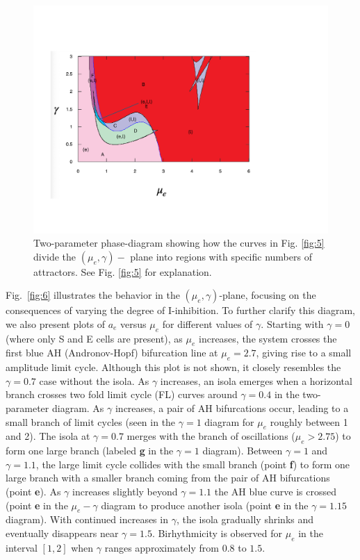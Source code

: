 \documentclass[10pt,letterpaper]{article}
\begin{document}
\begin{figure}
\includegraphics[width=.9\textwidth]{afig8.pdf}
\caption{Two-parameter phase-diagram showing how the curves in Fig. \ref{fig:5} divide the $(\mu_e,\gamma)-$ plane into regions with specific numbers of attractors. See Fig. \ref{fig:5} for explanation. }
\label{fig:7}
\end{figure}





Fig.~\ref{fig:6} illustrates the behavior in the $(\mu_e,\gamma)$-plane, focusing on the consequences of varying the degree of I-inhibition. To further clarify this diagram, we also present plots of $a_e$ versus $\mu_e$ for different values of $\gamma$. Starting with $\gamma = 0$ (where only S and E cells are present), as $\mu_e$ increases, the system crosses the first blue AH (Andronov-Hopf) bifurcation line at $\mu_e = 2.7$, giving rise to a small amplitude limit cycle. Although this plot is not shown, it closely resembles the $\gamma = 0.7$ case without the isola. As $\gamma$ increases, an isola emerges when a horizontal branch crosses two fold limit cycle (FL) curves around $\gamma = 0.4$ in the two-parameter diagram. As $\gamma$ increases, a pair of AH bifurcations occur, leading to a small branch of limit cycles (seen in the $\gamma=1$ diagram for $\mu_e$ roughly between 1 and 2). The isola at $\gamma=0.7$ merges with the branch of oscillations ($\mu_e>2.75$) to form one large branch (labeled {\bf g} in the $\gamma=1$ diagram).   Between $\gamma=1$ and $\gamma=1.1$, the large limit cycle collides with the small branch (point {\bf f}) to form one large branch with a smaller branch coming from the pair of AH bifurcations (point {\bf e}). As $\gamma$ increases slightly beyond $\gamma = 1.1$ the AH blue curve is crossed (point {\bf e} in the $\mu_e-\gamma$ diagram to produce another isola (point {\bf e} in the $\gamma=1.15$ diagram).   With continued increases in $\gamma$, the isola gradually shrinks and eventually disappears near $\gamma = 1.5$. Birhythmicity is observed for $\mu_e$ in the interval $[1, 2]$ when $\gamma$ ranges approximately from $0.8$ to $1.5$.
\end{document}
